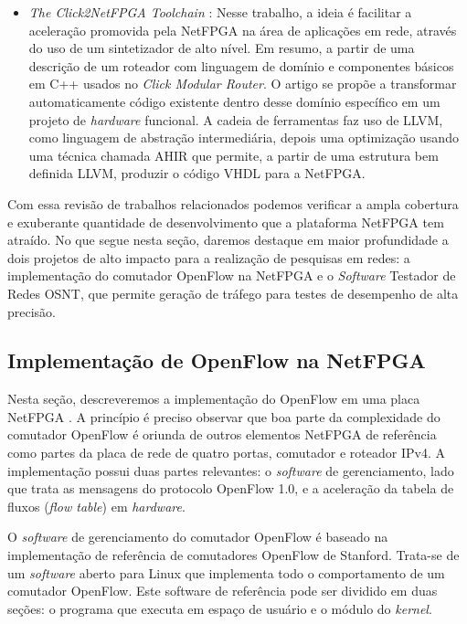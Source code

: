 \begin{itemize}
\item \textit{The Click2NetFPGA Toolchain} \cite{180848}: Nesse
trabalho, a ideia é facilitar a aceleração promovida pela NetFPGA na
área de aplicações em rede, através do uso de um sintetizador de alto
nível. Em resumo, a partir de uma descrição de um roteador com linguagem
de domínio e componentes básicos em C++ usados no \textit{Click Modular
Router}. O artigo se propõe a transformar automaticamente código
existente dentro desse domínio específico em um projeto de
\textit{hardware} funcional. A cadeia de ferramentas faz uso de LLVM,
como linguagem de abstração intermediária, depois uma optimização usando
uma técnica chamada AHIR que permite, a partir de uma estrutura bem
definida LLVM, produzir o código VHDL para a NetFPGA.

\end{itemize}

Com essa revisão de trabalhos relacionados podemos verificar a ampla
cobertura e exuberante quantidade de desenvolvimento que a plataforma
NetFPGA tem atraído. No que segue nesta seção, daremos destaque em maior
profundidade a dois projetos de alto impacto para a realização de
pesquisas em redes: a implementação do comutador OpenFlow na NetFPGA e o
\emph{Software} Testador de Redes OSNT, que permite geração de tráfego
para testes de desempenho de alta precisão.

\subsection{Implementação de OpenFlow na NetFPGA}

Nesta seção, descreveremos a implementação do OpenFlow em uma placa
NetFPGA \cite{Naous:2008:IOS:1477942.1477944}. A princípio é preciso
observar que boa parte da complexidade do comutador OpenFlow é oriunda
de outros elementos NetFPGA de referência como partes da placa de rede
de quatro portas, comutador e roteador IPv4. A implementação possui duas
partes relevantes: o \emph{software} de gerenciamento, lado que trata as
mensagens do protocolo OpenFlow 1.0, e a aceleração da tabela de fluxos
(\textit{flow table}) em \emph{hardware}.

O \emph{software} de gerenciamento do comutador OpenFlow é baseado na
implementação de referência de comutadores OpenFlow de Stanford.
Trata-se de um \emph{software} aberto para Linux que implementa todo o
comportamento de um comutador OpenFlow. Este software de referência pode
ser dividido em duas seções: o programa que executa em espaço de usuário
e o módulo do \emph{kernel}.


